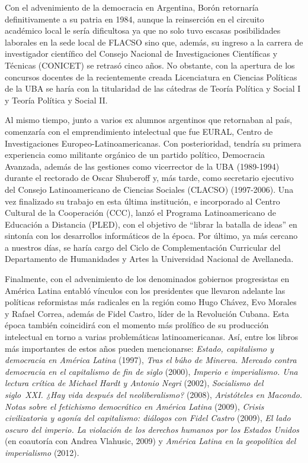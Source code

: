 Con el advenimiento de la democracia en Argentina, Borón retornaría definitivamente a su patria en 1984, aunque la reinserción en el circuito académico local le sería dificultosa ya que no solo tuvo escasas posibilidades laborales en la sede local de FLACSO sino que, además, su ingreso a la carrera de investigador científico del Consejo Nacional de Investigaciones Científicas y Técnicas (CONICET) se retrasó cinco años. No obstante, con la apertura de los concursos docentes de la recientemente creada Licenciatura en Ciencias Políticas de la UBA se haría con la titularidad de las cátedras de Teoría Política y Social I y Teoría Política y Social II.

Al mismo tiempo, junto a varios ex alumnos argentinos que retornaban al país, comenzaría con el emprendimiento intelectual que fue EURAL, Centro de Investigaciones Europeo-Latinoamericanas. Con posterioridad, tendría su primera experiencia como militante orgánico de un partido político, Democracia Avanzada, además de las gestiones como vicerrector de la UBA (1989-1994) durante el rectorado de Oscar Shuberoff y, más tarde, como secretario ejecutivo del Consejo Latinoamericano de Ciencias Sociales (CLACSO) (1997-2006). Una vez finalizado su trabajo en esta última institución, e incorporado al Centro Cultural de la Cooperación (CCC), lanzó el Programa Latinoamericano de Educación a Distancia (PLED), con el objetivo de \enquote{librar la batalla de ideas} en sintonía con los desarrollos informáticos de la época. Por último, ya más cercano a nuestros días, se haría cargo del Ciclo de Complementación Curricular del Departamento de Humanidades y Artes la Universidad Nacional de Avellaneda.

Finalmente, con el advenimiento de los denominados gobiernos progresistas en América Latina entabló vínculos con los presidentes que llevaron adelante las políticas reformistas más radicales en la región como Hugo Chávez, Evo Morales y Rafael Correa, además de Fidel Castro, líder de la Revolución Cubana. Esta época también coincidirá con el momento más prolífico de su producción intelectual en torno a varias problemáticas latinoamericanas. Así, entre los libros más importantes de estos años pueden mencionarse: \emph{Estado, capitalismo y democracia en América Latina} (1997), \emph{Tras el búho de Minerva. Mercado contra democracia en el capitalismo de fin de siglo} (2000), \emph{Imperio e imperialismo. Una lectura crítica de Michael Hardt y Antonio Negri} (2002), \emph{Socialismo del siglo~XXI. ¿Hay vida después del neoliberalismo?} (2008), \emph{Aristóteles en Macondo. Notas sobre el fetichismo democrático en América Latina} (2009), \emph{Crisis civilizatoria y agonía del capitalismo: diálogos con Fidel Castro} (2009), \emph{El lado oscuro del imperio. La violación de los derechos humanos por los Estados Unidos} (en coautoría con Andrea Vlahusic, 2009) y \emph{América Latina en la geopolítica del imperialismo} (2012).

